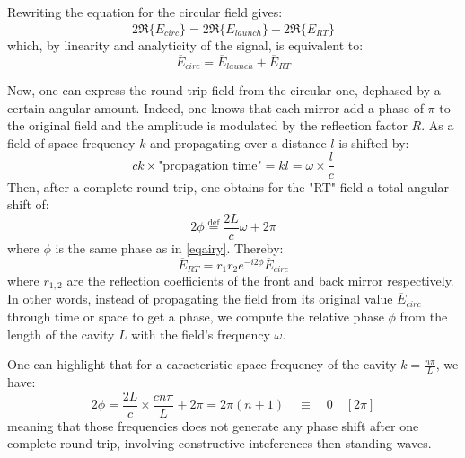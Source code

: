 \documentclass[12pt]{report}
\begin{document}
Rewriting the equation for the circular field gives:
\begin{equation}
2\Re\{\overline{E}_{circ}\} = 2\Re\{\overline{E}_{launch}\} + 2\Re\{\overline{E}_{RT}\}
\end{equation}
which, by linearity and analyticity of the signal, is equivalent to:
\begin{equation}
\label{eqecirc}
\overline{E}_{circ} = \overline{E}_{launch} + \overline{E}_{RT}
\end{equation}

Now, one can express the round-trip field from the circular one, dephased by a certain angular amount. Indeed, one knows that each mirror add a phase of $\pi$ to the original field and the amplitude is modulated by the reflection factor $R$. As a field of space-frequency $k$ and propagating over a distance $l$ is shifted by:
\begin{equation}
ck \times \textrm{"propagation time"} = kl = \omega \times \frac{l}{c}
\end{equation} 
Then, after a complete round-trip, one obtains for the "RT" field a total angular shift of:
\begin{equation}
2\phi \stackrel{\text{def}}{=} \frac{2L}{c}\omega + 2\pi
\end{equation} 
where $\phi$ is the same phase as in \eqref{eqairy}. Thereby:
\begin{equation}
\label{eqrt}
\overline{E}_{RT} = r_1 r_2 e^{-i2\phi} \overline{E}_{circ}
\end{equation}
where $r_{1,2}$ are the reflection coefficients of the front and back mirror respectively. In other words, instead of propagating the field from its original value $ \overline{E}_{circ}$ through time or space to get a phase, we compute the relative phase $\phi$ from the length of the cavity $L$ with the field's frequency $\omega$.

One can highlight that for a caracteristic space-frequency of the cavity $k=\frac{n\pi}{L}$, we have:
\begin{equation}
\label{phimodif}
2\phi = \frac{2L}{c} \times \frac{cn\pi}{L} + 2\pi = 2\pi(n + 1) \quad \equiv \quad 0 \quad [2\pi]
\end{equation}
meaning that those frequencies does not generate any phase shift after one complete round-trip, involving constructive inteferences then standing waves.
\end{document}

